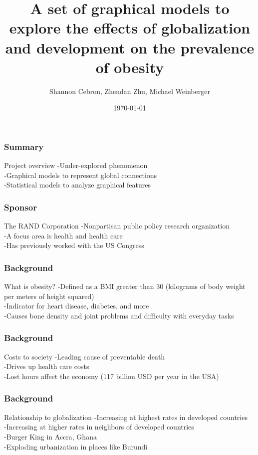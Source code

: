 \documentclass{beamer}
\title[Graphical models of obesity]{A set of graphical models to explore the effects of globalization and development on the prevalence of obesity}
\author{Shannon Cebron, Zhendan Zhu, Michael Weinberger}
\institute[Johns Hopkins University]
{
Johns Hopkins University \\
\medskip
{\emph{scebron@cis.jhu.edu}}
}
\date{\today}
\begin{document}
%
\begin{frame}
\titlepage
\end{frame}
%
\begin{frame}
\frametitle{Summary}
\begin{block}
{Project overview}
-Under-explored phenomenon
\\
-Graphical models to represent global connections
\\
-Statistical models to analyze graphical features
\end{block}
\end{frame}
%
\begin{frame}
\frametitle{Sponsor}
\begin{block}
{The RAND Corporation}
-Nonpartisan public policy research organization
\\
-A focus area is health and health care
\\
-Has previously worked with the US Congress
\end{block}
\end{frame}
%

\begin{frame}
\frametitle{Background}
\begin{block}
{What is obesity?}
-Defined as a BMI greater than 30 (kilograms of body weight per meters of height squared)
\\
-Indicator for heart disease, diabetes, and more
\\
-Causes bone density and joint problems and difficulty with everyday tasks
\end{block}
\end{frame}

\begin{frame}
\frametitle{Background}
\begin{block}
{Costs to society}
-Leading cause of preventable death
\\
-Drives up health care costs
\\
-Lost hours affect the economy (117 billion USD per year in the USA)
\end{block}
\end{frame}

\begin{frame}
\frametitle{Background}
\begin{block}
{Relationship to globalization}
-Increasing at highest rates in developed countries
\\
-Increasing at higher rates in neighbors of developed countries
\\
-Burger King in Accra, Ghana
\\
-Exploding urbanization in places like Burundi
\end{block}
\end{frame}
\end{document}

